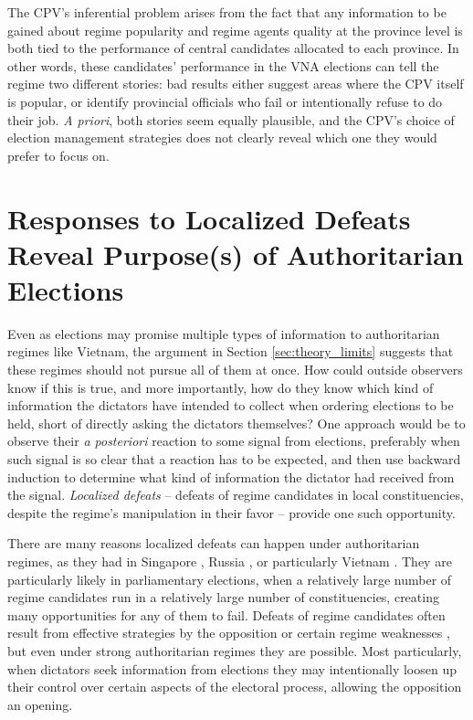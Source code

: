 \documentclass[12pt]{article}
\newcommand{\1}{\mathbbm{1}}
\begin{document}
The CPV's inferential problem arises from the fact that any information to be gained about regime popularity and regime agents quality at the province level is both tied to the performance of central candidates allocated to each province. In other words, these candidates' performance in the VNA elections can tell the regime two different stories: bad results either suggest areas where the CPV itself is popular, or identify provincial officials who fail or intentionally refuse to do their job. \textit{A priori}, both stories seem equally plausible, and the CPV's choice of election management strategies does not clearly reveal which one they would prefer to focus on.

\section{Responses to Localized Defeats Reveal Purpose(s) of Authoritarian Elections}
\label{sec:theory_local_defeat}

Even as elections may promise multiple types of information to authoritarian regimes like Vietnam, the argument in Section \ref{sec:theory_limits} suggests that these regimes should not pursue all of them at once. How could outside observers know if this is true, and more importantly, how do they know which kind of information the dictators have intended to collect when ordering elections to be held, short of directly asking the dictators themselves? One approach would be to observe their \textit{a posteriori} reaction to some signal from elections, preferably when such signal is so clear that a reaction has to be expected, and then use backward induction to determine what kind of information the dictator had received from the signal. \textit{Localized defeats} -- defeats of regime candidates in local constituencies, despite the regime's manipulation in their favor -- provide one such opportunity.

There are many reasons localized defeats can happen under authoritarian regimes, as they had in Singapore \citep{Ortmann2011, Miller2015}, Russia \citep{Gelman2013}, or particularly Vietnam \citep{MaleskySchuler2011}. They are particularly likely in parliamentary elections, when a relatively large number of regime candidates run in a relatively large number of constituencies, creating many opportunities for any of them to fail. Defeats of regime candidates often result from effective strategies by the opposition \citep{BunceWolchik2010} or certain regime weaknesses \citep{LevistkyWay2010}, but even under strong authoritarian regimes they are possible. Most particularly, when dictators seek information from elections they may intentionally loosen up their control over certain aspects of the electoral process, allowing the opposition an opening.
\end{document}
